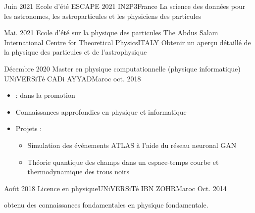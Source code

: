 %
%
%

\begin{experiences}

  \experience
  {Juin 2021}  {Ecole d'été ESCAPE 2021 }{IN2P3}{France}
  {}  	{La science des données pour les astronomes, les astroparticules et les physiciens des particules}
                  {}   
  \emptySeparator   

  \experience
  {Mai. 2021}  {Ecole d'été sur la physique des particules }{The Abdus Salam International Centre for Theoretical Physics}{ITALY}
  {}  	{Obtenir un aperçu détaillé de la physique des particules et de l'astrophysique }
                  {}   
  \emptySeparator     

  \experience
  {Décembre 2020}       {Master en physique computationnelle (physique informatique) }{UNiVERSiTé CADi AYYAD}{Maroc}
  {oct. 2018}  
     {
                      \begin{itemize}
                        \item {:  dans la promotion}
                        \item Connaissances approfondies en physique et informatique
                        \item Projets : 
                        \begin{itemize}
                          \item Simulation des événements ATLAS à l'aide du réseau neuronal GAN
                          \item Théorie quantique des champs dans un espace-temps courbe et thermodynamique des trous noirs
                        \end{itemize}
                      \end{itemize}
                    }
                    {}
  \emptySeparator         
  \experience
  {Août 2018}  {Licence en physique}{UNiVERSiTé IBN ZOHR}{Maroc}
  {Oct. 2014}   {
    obtenu des connaissances fondamentales en physique fondamentale.  
                      
                  }
                  {}  
\end{experiences}
